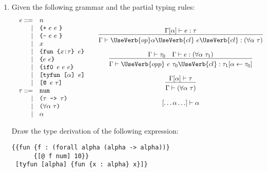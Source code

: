 \begin{enumerate}
\item Given the following grammar and the partial typing rules:
\[
\begin{array}{ll}
\begin{array}{rl}
e ::= & n\\
\mid& \verb!{+!\ e\ e\ \verb+}+\\
\mid& \verb!{-!\ e\ e\ \verb+}+\\
\mid& x\\
\mid& \verb+{fun {+x \verb+:+\tau \verb+} + e\verb+}+\\
\mid& \verb+{+e\ e \verb+}+\\
\mid& \verb+{if0 + e\ e\ e\verb+}+\\
\mid& \verb+[tyfun [+\alpha\verb+] + e\verb+]+\\
\mid& \verb+[@ +e\ \tau\verb+]+\\
\tau ::= & \verb+num+\\
\mid&\verb+(+\tau\verb+ -> +\tau\verb+)+\\
\mid&\verb+(+\forall \alpha\ \tau\verb+)+\\
\mid&\alpha
\end{array}
&
\begin{array}{c}

\newinfrule
{\Gamma[\alpha]\vdash e : \tau}
{\Gamma\vdash\UseVerb{op}\alpha\UseVerb{cl}\ e\UseVerb{cl} : (\forall \alpha\ \tau)}
\\[2em]
\newinfrule{
\Gamma\vdash \tau_0
\rulesep
\Gamma\vdash e : (\forall\alpha\ \tau_1)
}
{\Gamma\vdash\UseVerb{opp}\ e\ \tau_0\UseVerb{cl} : \tau_1[\alpha \leftarrow \tau_0]}
\\[2em]
\newinfrule{
\Gamma[\alpha]\vdash \tau
}
{\Gamma\vdash(\forall\alpha\ \tau)}
\\[2em]
[\ldots\alpha\ldots]\vdash\alpha
\end{array}
\end{array}
\]



Draw the type derivation of the following expression:

{
\begin{verbatim}
{{fun {f : (forall alpha (alpha -> alpha))}
      {[@ f num] 10}}
 [tyfun [alpha] {fun {x : alpha} x}]}
\end{verbatim}
}


\end{enumerate}

